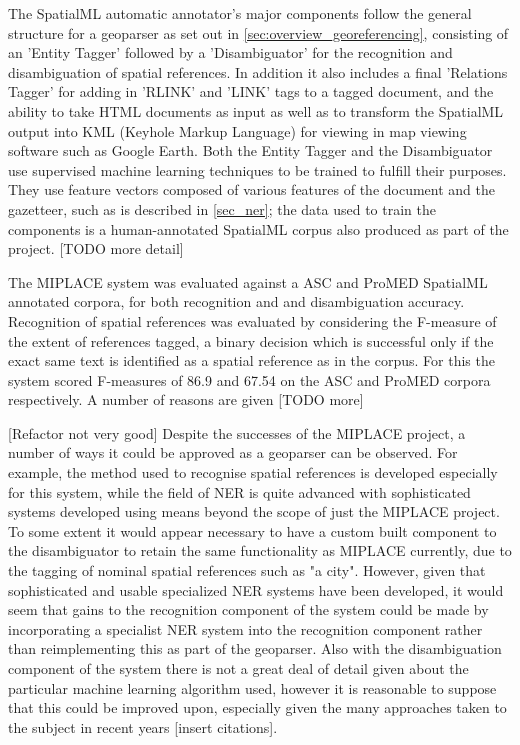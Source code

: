 \documentclass[12pt, a4paper]{report}
\begin{document}
The SpatialML automatic annotator's major components follow the general structure for a geoparser as set out in \ref{sec:overview_georeferencing}, consisting of an 'Entity Tagger' followed by a 'Disambiguator' for the recognition and disambiguation of spatial references. In addition it also includes a final 'Relations Tagger' for adding in 'RLINK' and 'LINK' tags to a tagged document, and the ability to take HTML documents as input as well as to transform the SpatialML output into KML (Keyhole Markup Language) for viewing in map viewing software such as Google Earth. Both the Entity Tagger and the Disambiguator use supervised machine learning techniques to be trained to fulfill their purposes. They use feature vectors composed of various features of the document and the gazetteer, such as is described in \ref{sec_ner}; the data used to train the components is a human-annotated SpatialML corpus also produced as part of the project. [TODO more detail]

The MIPLACE system was evaluated against a ASC and ProMED SpatialML annotated corpora, for both recognition and and disambiguation accuracy. Recognition of spatial references was evaluated by considering the F-measure of the extent of references tagged, a binary decision which is successful only if the exact same text is identified as a spatial reference as in the corpus. For this the system scored F-measures of 86.9 and 67.54 on the ASC and ProMED corpora respectively. A number of reasons are given [TODO more]

[Refactor not very good] Despite the successes of the MIPLACE project, a number of ways it could be approved as a geoparser can be observed. For example, the method used to recognise spatial references is developed especially for this system, while the field of NER is quite advanced with sophisticated systems developed using means beyond the scope of just the MIPLACE project. To some extent it would appear necessary to have a custom built component to the disambiguator to retain the same functionality as MIPLACE currently, due to the tagging of nominal spatial references such as "a city". However, given that sophisticated and usable specialized NER systems have been developed, it would seem that gains to the recognition component of the system could be made by incorporating a specialist NER system into the recognition component rather than reimplementing this as part of the geoparser. Also with the disambiguation component of the system there is not a great deal of detail given about the particular machine learning algorithm used, however it is reasonable to suppose that this could be improved upon, especially given the many approaches taken to the subject in recent years [insert citations].
\end{document}
